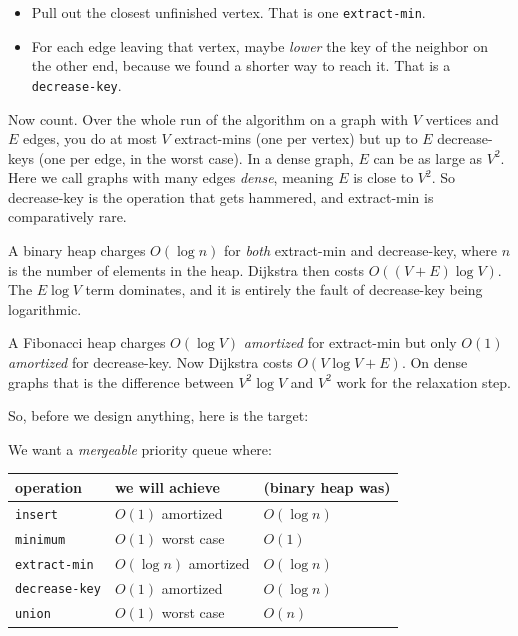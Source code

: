 \begin{itemize}
  \item Pull out the closest unfinished vertex. That is one \lstinline|extract-min|.
  \item For each edge leaving that vertex, maybe \emph{lower} the key of the
        neighbor on the other end, because we found a shorter way to reach it.
        That is a \lstinline|decrease-key|.
\end{itemize}

Now count. Over the whole run of the algorithm on a graph with $V$ vertices and
$E$ edges, you do at most $V$ extract-mins (one per vertex) but up to $E$
decrease-keys (one per edge, in the worst case). In a dense graph, $E$ can be as
large as $V^2$. Here we call graphs with many edges \emph{dense}, meaning $E$ is close to $V^2$. So decrease-key is the operation that gets hammered, and
extract-min is comparatively rare.

\begin{intuitionbox}
A binary heap charges $O(\log n)$ for \emph{both} extract-min and decrease-key, where $n$ is the number of elements in the heap.
Dijkstra then costs $O((V+E)\log V)$. The $E\log V$ term dominates, and it is
entirely the fault of decrease-key being logarithmic.

A Fibonacci heap charges $O(\log V)$ \emph{amortized} for extract-min but only
$O(1)$ \emph{amortized} for decrease-key. Now Dijkstra costs
$O(V\log V + E)$. On dense
graphs that is the difference between $V^2 \log V$ and $V^2$ work for the
relaxation step.
\end{intuitionbox}

So, before we design anything, here is the target:

\begin{focusbox}
We want a \emph{mergeable} priority queue where:
\begin{center}
\begin{tabular}{lll}
\toprule
operation & we will achieve & (binary heap was) \\
\midrule
\lstinline|insert|        & $O(1)$ amortized & $O(\log n)$ \\
\lstinline|minimum|       & $O(1)$ worst case & $O(1)$ \\
\lstinline|extract-min|   & $O(\log n)$ amortized & $O(\log n)$ \\
\lstinline|decrease-key|  & $O(1)$ amortized & $O(\log n)$ \\
\lstinline|union|         & $O(1)$ worst case & $O(n)$ \\
\bottomrule
\end{tabular}
\end{center}
\end{focusbox}

